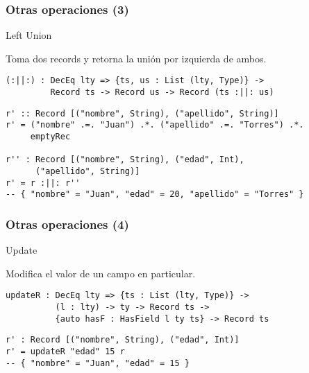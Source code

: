 \documentclass{beamer}
\begin{document}
\begin{frame}[fragile]
\frametitle{Otras operaciones (3)}

\begin{block}{Left Union}

Toma dos records y retorna la unión por izquierda de ambos.

\begin{example}
\begin{verbatim}
(:||:) : DecEq lty => {ts, us : List (lty, Type)} -> 
         Record ts -> Record us -> Record (ts :||: us)
\end{verbatim}
\end{example}

\begin{example}[Ejemplo]
\begin{verbatim}
r' :: Record [("nombre", String), ("apellido", String)]
r' = ("nombre" .=. "Juan") .*. ("apellido" .=. "Torres") .*. 
     emptyRec

r'' : Record [("nombre", String), ("edad", Int), 
      ("apellido", String)]
r' = r :||: r''
-- { "nombre" = "Juan", "edad" = 20, "apellido" = "Torres" }
\end{verbatim}
\end{example}

\end{block}
\end{frame}

\begin{frame}[fragile]
\frametitle{Otras operaciones (4)}

\begin{block}{Update}

Modifica el valor de un campo en particular.

\begin{example}
\begin{verbatim}
updateR : DecEq lty => {ts : List (lty, Type)} -> 
          (l : lty) -> ty -> Record ts -> 
          {auto hasF : HasField l ty ts} -> Record ts
\end{verbatim}
\end{example}

\begin{example}[Ejemplo]
\begin{verbatim}
r' : Record [("nombre", String), ("edad", Int)]
r' = updateR "edad" 15 r
-- { "nombre" = "Juan", "edad" = 15 }
\end{verbatim}
\end{example}

\end{block}

\end{frame}
\end{document}
